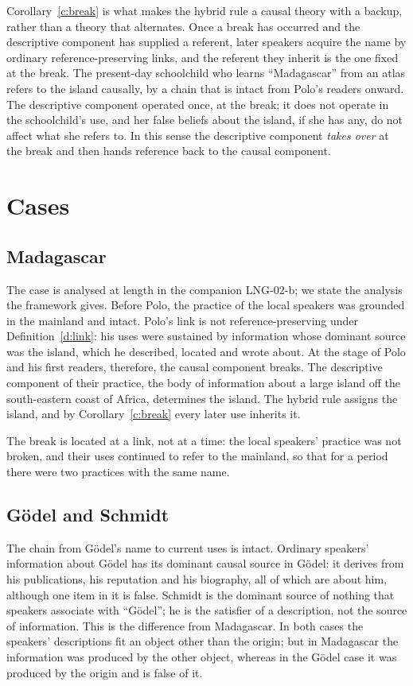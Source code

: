 \documentclass{situationist-preprint}
\begin{document}
Corollary~\ref{c:break} is what makes the hybrid rule a causal theory with a backup, rather than a theory that alternates. Once a break has occurred and the descriptive component has supplied a referent, later speakers acquire the name by ordinary reference-preserving links, and the referent they inherit is the one fixed at the break. The present-day schoolchild who learns \enquote{Madagascar} from an atlas refers to the island causally, by a chain that is intact from Polo's readers onward. The descriptive component operated once, at the break; it does not operate in the schoolchild's use, and her false beliefs about the island, if she has any, do not affect what she refers to. In this sense the descriptive component \emph{takes over} at the break and then hands reference back to the causal component.

\section{Cases}

\subsection{Madagascar}

The case is analysed at length in the companion LNG-02-b; we state the analysis the framework gives. Before Polo, the practice of the local speakers was grounded in the mainland and intact. Polo's link is not reference-preserving under Definition~\ref{d:link}: his uses were sustained by information whose dominant source was the island, which he described, located and wrote about. At the stage of Polo and his first readers, therefore, the causal component breaks. The descriptive component of their practice, the body of information about a large island off the south-eastern coast of Africa, determines the island. The hybrid rule assigns the island, and by Corollary~\ref{c:break} every later use inherits it.

The break is located at a link, not at a time: the local speakers' practice was not broken, and their uses continued to refer to the mainland, so that for a period there were two practices with the same name.

\subsection{G\"odel and Schmidt}

The chain from G\"odel's name to current uses is intact. Ordinary speakers' information about G\"odel has its dominant causal source in G\"odel: it derives from his publications, his reputation and his biography, all of which are about him, although one item in it is false. Schmidt is the dominant source of nothing that speakers associate with \enquote{G\"odel}; he is the satisfier of a description, not the source of information. This is the difference from Madagascar. In both cases the speakers' descriptions fit an object other than the origin; but in Madagascar the information was produced by the other object, whereas in the G\"odel case it was produced by the origin and is false of it.
\end{document}
